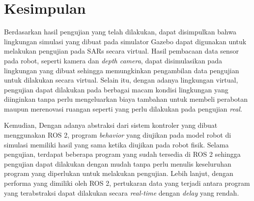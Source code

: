 \section{Kesimpulan}
\label{sec:kesimpulan}

Berdasarkan hasil pengujian yang telah dilakukan,
  dapat disimpulkan bahwa lingkungan simulasi yang dibuat pada simulator Gazebo dapat digunakan untuk melakukan pengujian pada SARs secara virtual.
Hasil pembacaan data sensor pada robot, seperti kamera dan \emph{depth camera},
  dapat disimulasikan pada lingkungan yang dibuat sehingga memungkinkan pengambilan data pengujian untuk dilakukan secara virtual.
Selain itu, dengan adanya lingkungan virtual,
  pengujian dapat dilakukan pada berbagai macam kondisi lingkungan yang diinginkan tanpa perlu mengeluarkan biaya tambahan untuk membeli perabotan maupun merenovasi ruangan seperti yang perlu dilakukan pada pengujian \emph{real}.

Kemudian, Dengan adanya abstraksi dari sistem kontroler yang dibuat menggunakan ROS 2,
  program \emph{behavior} yang diujikan pada model robot di simulasi memiliki hasil yang sama ketika diujikan pada robot fisik.
Selama pengujian, terdapat beberapa program yang sudah tersedia di ROS 2 sehingga pengujian dapat dilakukan dengan mudah tanpa perlu menulis keseluruhan program yang diperlukan untuk melakukan pengujian.
Lebih lanjut, dengan performa yang dimiliki oleh ROS 2,
  pertukaran data yang terjadi antara program yang terabstraksi dapat dilakukan secara \emph{real-time} dengan \emph{delay} yang rendah.
